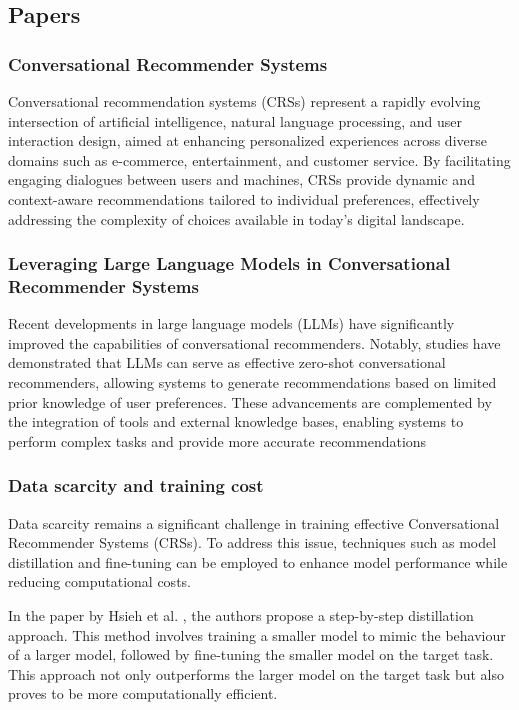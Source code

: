


\subsection{Papers}
\subsubsection{Conversational Recommender Systems}
Conversational recommendation systems (CRSs) represent a rapidly evolving intersection of artificial intelligence, natural language processing, and user interaction
design, aimed at enhancing personalized experiences across diverse domains such as e-commerce, entertainment, and customer service. 
By facilitating engaging dialogues between users and machines, CRSs provide dynamic and context-aware
recommendations tailored to individual preferences, effectively addressing the complexity of choices available in today's digital landscape.

\subsubsection{Leveraging Large Language Models in Conversational Recommender Systems}
Recent developments\cite{bdcc8040036} in large language models (LLMs) have significantly improved
the capabilities of conversational recommenders. 
Notably, studies have demonstrated that LLMs can serve as effective zero-shot conversational recommenders,
allowing systems to generate recommendations based on limited prior knowledge of
user preferences. These advancements are complemented by the integration
of tools and external knowledge bases, enabling systems to perform complex tasks
and provide more accurate recommendations


\subsubsection{Data scarcity and training cost}
Data scarcity remains a significant challenge in training effective Conversational Recommender Systems (CRSs). To address this issue, techniques such as model distillation and fine-tuning can be employed to enhance model performance while reducing computational costs.

In the paper by Hsieh et al. \cite{hsieh2023distillingstepbystepoutperforminglarger}, the authors propose a step-by-step distillation approach. This method involves training a smaller model to mimic the behaviour of a larger model, followed by fine-tuning the smaller model on the target task. This approach not only outperforms the larger model on the target task but also proves to be more computationally efficient.

